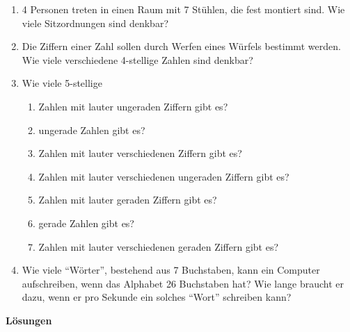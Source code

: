 \begin{ueb}
\begin{enumerate}
        \item 4 Personen treten in einen Raum mit 7 Stühlen, die fest montiert sind. Wie viele Sitzordnungen sind denkbar?

        \item Die Ziffern einer Zahl sollen durch Werfen eines Würfels bestimmt werden. Wie viele verschiedene 4-stellige Zahlen sind denkbar?

        \item Wie viele 5-stellige
              \begin{enumerate}
                  \item Zahlen mit lauter ungeraden Ziffern gibt es?
                  \item ungerade Zahlen gibt es?
                  \item Zahlen mit lauter verschiedenen Ziffern gibt es?
                  \item Zahlen mit lauter verschiedenen ungeraden Ziffern gibt es?
                  \item Zahlen mit lauter geraden Ziffern gibt es?
                  \item gerade Zahlen gibt es?
                  \item Zahlen mit lauter verschiedenen geraden Ziffern gibt es?
              \end{enumerate}

        \item Wie viele ``Wörter'', bestehend aus 7 Buchstaben, kann ein Computer aufschreiben, wenn das Alphabet 26 Buchstaben hat? Wie lange braucht er dazu, wenn er pro Sekunde ein solches ``Wort'' schreiben kann?
    \end{enumerate}

\end{ueb}
\clearpage
\textbf{Lösungen}
